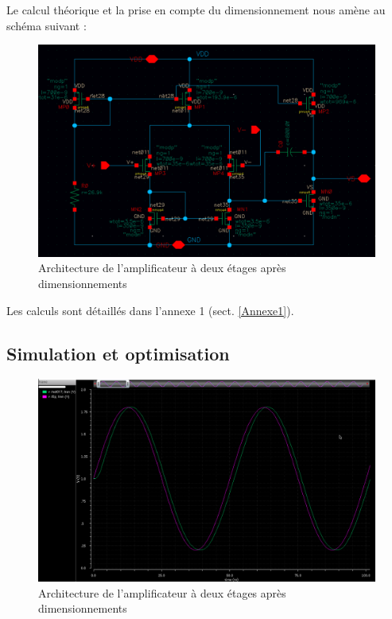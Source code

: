\documentclass[11pt]{article}
\begin{document}
Le calcul th\'eorique et la prise en compte du dimensionnement nous am\`ene au sch\'ema
suivant :

\begin{figure}[!htb]
\begin{center}
  \includegraphics[width=\linewidth]{amplificateur_.png}
  \caption{Architecture de l'amplificateur \`a deux \'etages apr\`es dimensionnements}
\end{center}
\end{figure}

Les calculs sont d\'etaill\'es dans l'annexe 1 (sect. \ref{Annexe1}). 
 
\clearpage

\subsection{Simulation et optimisation}

\begin{figure}[!htb]
\begin{center}
  \includegraphics[width=\linewidth]{reponse_ampli.png}
  \caption{Architecture de l'amplificateur \`a deux \'etages apr\`es dimensionnements}
\end{center}
\end{figure}
\end{document}
